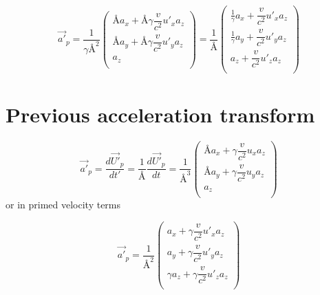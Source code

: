 \begin{equation}%
    \Vec{a'}_p=  \dfrac{1}{\gamma\text{\AA}^2 }\begin{pmatrix}
    \text{\AA} a_x + \text{\AA}\gamma \dfrac{v}{c^2} u'_x a_z \\
    \text{\AA} a_y + \text{\AA}\gamma \dfrac{v}{c^2} u'_y a_z  \\
     a_z \\
    \end{pmatrix}
    =  \dfrac{1}{\text{\AA} }\begin{pmatrix}
     \frac{1}{\gamma} a_x +  \dfrac{v}{c^2} u'_x a_z \\
     \frac{1}{\gamma} a_y +  \dfrac{v}{c^2} u'_y a_z  \\
     a_z +  \dfrac{v}{c^2} u'_z a_z\\
    \end{pmatrix}
\end{equation}%

\section{Previous acceleration transform}

\begin{equation}%
    \Vec{a'}_p = \dfrac{d\Vec{U'}_p}{dt'} = \dfrac{1}{\text{\AA}}\dfrac{d\Vec{U'}_p}{dt} = \dfrac{1}{\text{\AA}^3} \begin{pmatrix}
    \text{\AA} a_x + \gamma\dfrac{v}{c^2} u_x a_z \\
    \text{\AA} a_y + \gamma\dfrac{v}{c^2} u_y a_z  \\
    a_z \\
    \end{pmatrix}
\end{equation}%
or in primed velocity terms

\begin{equation}%
    \Vec{a'}_p = \dfrac{1}{\text{\AA}^2} \begin{pmatrix}
    a_x + \gamma\dfrac{v}{c^2} u'_x a_z \\
    a_y + \gamma\dfrac{v}{c^2} u'_y a_z  \\
    \gamma a_z + \gamma\dfrac{v}{c^2} u'_z a_z\\
    \end{pmatrix}
\end{equation}%

